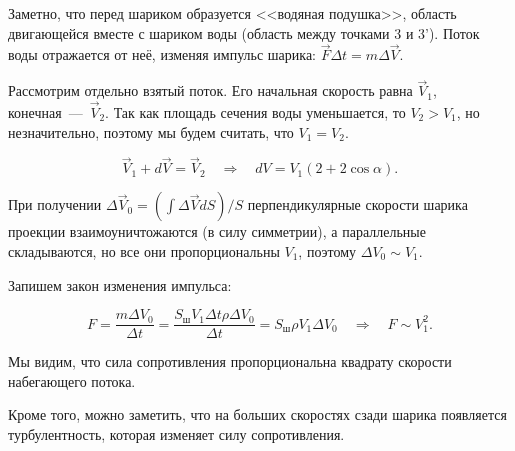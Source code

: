Заметно, что перед шариком образуется <<водяная подушка>>, область
двигающейся вместе с шариком воды (область между точками 3 и
3'). Поток воды отражается от неё, изменяя импульс шарика: $\vec{F}
\Delta t = m \Delta \vec{V}$. 


Рассмотрим отдельно взятый поток. Его начальная скорость равна
$\vec{V}_1$, конечная~---~$\vec{V}_2$. Так как площадь сечения воды
уменьшается, то $V_2 > V_1$, но незначительно, поэтому мы будем
считать, что $V_1 = V_2$. 

\begin{equation}
  \label{eq:bz_3}
  \vec{V}_1 + d\vec{V} = \vec{V}_2 \quad \Rightarrow \quad dV = V_1 (2 + 2 \cos
  \alpha). 
\end{equation}

При получении $\Delta \vec{V}_0 = \left(\int \Delta \vec{V}  dS \right)
/S$ перпендикулярные скорости шарика проекции взаимоуничтожаются (в
силу симметрии), а параллельные складываются, но все они
пропорциональны $V_1$, поэтому $\Delta V_0 \sim V_1$. 

Запишем закон изменения импульса: 

\begin{equation}
  \label{eq:bz_4}
  F = \frac{m \Delta V_0}{\Delta t} = \frac{S_{\mbox{ш}} V_1 \Delta t
    \rho \Delta V_0}{\Delta t} = S_{\mbox{ш}} \rho V_1 \Delta V_0 \quad
  \Rightarrow \quad F \sim V_1^2.
\end{equation}

Мы видим, что сила сопротивления пропорциональна квадрату скорости
набегающего потока. 

Кроме того, можно заметить, что на больших скоростях сзади шарика
появляется турбулентность, которая изменяет силу сопротивления. 

